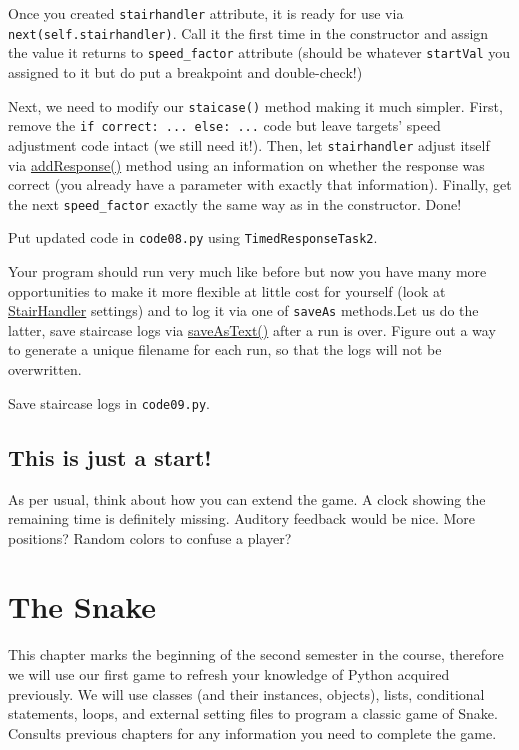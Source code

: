 \documentclass[
]{book}
\begin{document}
Once you created \texttt{stairhandler} attribute, it is ready for use via \texttt{next(self.stairhandler)}. Call it the first time in the constructor and assign the value it returns to \texttt{speed\_factor} attribute (should be whatever \texttt{startVal} you assigned to it but do put a breakpoint and double-check!)

Next, we need to modify our \texttt{staicase()} method making it much simpler. First, remove the \texttt{if\ correct:\ ...\ else:\ ...} code but leave targets' speed adjustment code intact (we still need it!). Then, let \texttt{stairhandler} adjust itself via \href{https://psychopy.org/api/data.html\#psychopy.data.StairHandler.addResponse}{addResponse()} method using an information on whether the response was correct (you already have a parameter with exactly that information). Finally, get the next \texttt{speed\_factor} exactly the same way as in the constructor. Done!

Put updated code in \texttt{code08.py} using \texttt{TimedResponseTask2}.

Your program should run very much like before but now you have many more opportunities to make it more flexible at little cost for yourself (look at \href{https://psychopy.org/api/data.html\#stairhandler}{StairHandler} settings) and to log it via one of \texttt{saveAs} methods.Let us do the latter, save staircase logs via \href{https://psychopy.org/api/data.html\#psychopy.data.StairHandler.saveAsText}{saveAsText()} after a run is over. Figure out a way to generate a unique filename for each run, so that the logs will not be overwritten.

Save staircase logs in \texttt{code09.py}.

\hypertarget{this-is-just-a-start}{%
\section{This is just a start!}\label{this-is-just-a-start}}

As per usual, think about how you can extend the game. A clock showing the remaining time is definitely missing. Auditory feedback would be nice. More positions? Random colors to confuse a player?

\hypertarget{the-snake}{%
\chapter{The Snake}\label{the-snake}}

This chapter marks the beginning of the second semester in the course, therefore we will use our first game to refresh your knowledge of Python acquired previously. We will use classes (and their instances, objects), lists, conditional statements, loops, and external setting files to program a classic game of Snake. Consults previous chapters for any information you need to complete the game.
\end{document}
